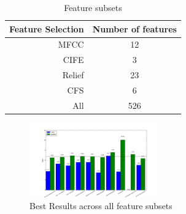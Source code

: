 \documentclass{article}
\begin{document}
 	\begin{table}[h]
 		\begin{center}
  			\begin{tabular}{ | r | c | }
    			\hline
			 \bfseries Feature Selection 	&\bfseries Number of features \\ \hline
			 MFCC           			& 12 \\ \hline
			 CIFE        				& 3 \\ \hline
			 Relief 				& 23 \\ \hline
			 CFS 					& 6 \\ \hline
			 All 					& 526 \\ \hline
			 \end{tabular}
		\end{center}
 	\caption{Feature subsets}
 	\label{feat_subset}
 	\end{table}

	\begin{figure}[h]
 		\begin{center}
		\includegraphics[width=0.5\textwidth]{results_best} 
  		\end{center}
  		\caption{Best Results across all feature subsets}
  		\label{results_best}
 	\end{figure}
\end{document}
